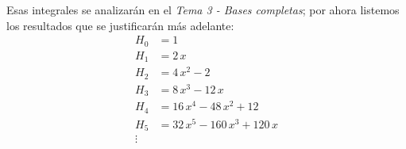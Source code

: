 Esas integrales se analizarán en el \emph{Tema 3 - Bases completas}; por ahora listemos los resultados que se justificarán más adelante:
\begin{align*}
H_{0} &= 1 \\[0.5em]
H_{1} &= 2 \, x \\[0.5em]
H_{2} &= 4 \, x^{2} - 2 \\[0.5em]
H_{3} &= 8 \, x^{3} - 12 \, x \\[0.5em]
H_{4} &= 16 \, x^{4} - 48 \, x^{2} + 12 \\[0.5em]
H_{5} &= 32 \, x^{5} - 160 \, x^{3} + 120 \, x \\[0.5em]
\vdots
\end{align*}

